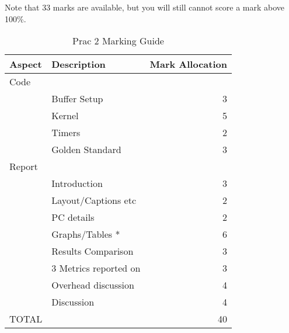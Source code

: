 Note that 33 marks are available, but you will still cannot score a mark above 100\%.
\begin{table}[H]
\centering
\caption{Prac 2 Marking Guide}
\label{tbl:Prac2Marks}
\begin{tabular}{|l|l|r|}
\hline
\textbf{Aspect} & \textbf{Description} & \multicolumn{1}{l|}{\textbf{Mark Allocation}} \\ \hline
Code  & & \\ \hline
 & Buffer Setup & 3 \\ \hline
 & Kernel & 5 \\ \hline
 & Timers & 2 \\ \hline
 & Golden Standard & 3 \\ \hline
Report & & \\ \hline
 & Introduction & 3 \\ \hline
 & Layout/Captions etc & 2 \\ \hline
 & PC details & 2 \\ \hline
 & Graphs/Tables * & 6 \\ \hline
 & Results Comparison & 3 \\ \hline
 & 3 Metrics reported on & 3 \\ \hline
 & Overhead discussion & 4 \\ \hline
 & Discussion & 4 \\ \hline

TOTAL &  & 40 \\ \hline
\end{tabular}
\end{table}